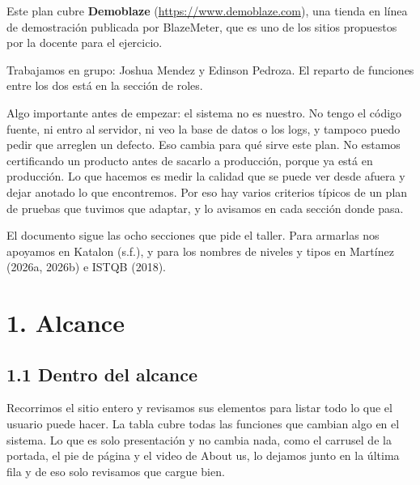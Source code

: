 \documentclass[11pt,a4paper]{article}
\begin{document}
Este plan cubre \textbf{Demoblaze} (\url{https://www.demoblaze.com}), una tienda en
línea de demostración publicada por BlazeMeter, que es uno de los sitios propuestos
por la docente para el ejercicio.

Trabajamos en grupo: Joshua Mendez y Edinson Pedroza. El reparto de funciones entre
los dos está en la sección de roles.

Algo importante antes de empezar: el sistema no es nuestro. No tengo el código fuente,
ni entro al servidor, ni veo la base de datos o los logs, y tampoco puedo pedir que
arreglen un defecto. Eso cambia para qué sirve este plan. No estamos certificando un
producto antes de sacarlo a producción, porque ya está en producción. Lo que hacemos es
medir la calidad que se puede ver desde afuera y dejar anotado lo que encontremos.
Por eso hay varios criterios típicos de un plan de pruebas que tuvimos que adaptar, y
lo avisamos en cada sección donde pasa.

El documento sigue las ocho secciones que pide el taller. Para armarlas nos apoyamos en
Katalon (s.f.), y para los nombres de niveles y tipos en Martínez (2026a, 2026b) e
ISTQB (2018).

\FloatBarrier
\section*{1. Alcance}

\subsection*{1.1 Dentro del alcance}

Recorrimos el sitio entero y revisamos sus elementos para listar todo lo que el usuario
puede hacer. La tabla cubre todas las funciones que cambian algo en el sistema. Lo
que es solo presentación y no cambia nada, como el carrusel de la portada, el pie de
página y el video de About us, lo dejamos junto en la última fila y de eso solo revisamos
que cargue bien.
\end{document}
